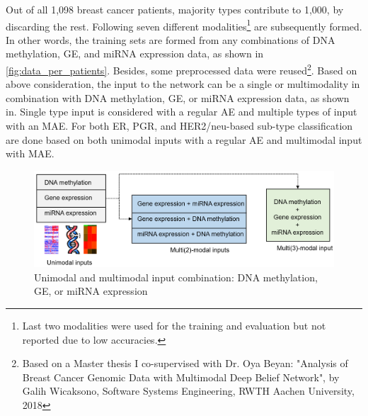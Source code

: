 \hspace*{3.5mm} Out of all 1,098 breast cancer patients, majority types contribute to 1,000, by discarding the rest. Following seven different modalities\footnote{Last two modalities were used for the training and evaluation but not reported due to low accuracies.} are subsequently formed. In other words, the training sets are formed from any combinations of DNA methylation, GE, and miRNA expression data, as shown in \cref{fig:data_per_patients}. Besides, some preprocessed data were reused\footnote{Based on a Master thesis I co-supervised with Dr. Oya Beyan: "Analysis of Breast Cancer Genomic Data with Multimodal Deep Belief Network", by Galih Wicaksono, Software Systems Engineering, RWTH Aachen University, 2018}. Based on above consideration, the input to the network can be a single or multimodality in combination with DNA methylation, GE, or miRNA expression data, as shown in. Single type input is considered with a regular AE and multiple types of input with an MAE. For both ER, PGR, and HER2/neu-based sub-type classification are done based on both unimodal inputs with a regular AE and multimodal input with MAE. 

\begin{figure}
	\centering
	\includegraphics[scale=0.6]{images/input_combination.png}
	\caption[Different uni- and multi-modality input combination]{Unimodal and multimodal input combination: DNA methylation, GE, or miRNA expression}
	\label{fig:input_comb}
\end{figure}

